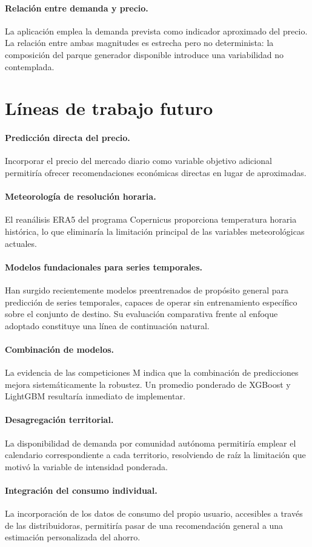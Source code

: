 \paragraph{Relación entre demanda y precio.}
La aplicación emplea la demanda prevista como indicador aproximado del precio. La
relación entre ambas magnitudes es estrecha pero no determinista: la composición
del parque generador disponible introduce una variabilidad no contemplada.


\section{Líneas de trabajo futuro}

\paragraph{Predicción directa del precio.}
Incorporar el precio del mercado diario como variable objetivo adicional
permitiría ofrecer recomendaciones económicas directas en lugar de aproximadas.

\paragraph{Meteorología de resolución horaria.}
El reanálisis ERA5 del programa Copernicus proporciona temperatura horaria
histórica, lo que eliminaría la limitación principal de las variables
meteorológicas actuales.

\paragraph{Modelos fundacionales para series temporales.}
Han surgido recientemente modelos preentrenados de propósito general para
predicción de series temporales, capaces de operar sin entrenamiento específico
sobre el conjunto de destino. Su evaluación comparativa frente al enfoque adoptado
constituye una línea de continuación natural.

\paragraph{Combinación de modelos.}
La evidencia de las competiciones M \parencite{makridakis2020m4} indica que la
combinación de predicciones mejora sistemáticamente la robustez. Un promedio
ponderado de XGBoost y LightGBM resultaría inmediato de implementar.

\paragraph{Desagregación territorial.}
La disponibilidad de demanda por comunidad autónoma permitiría emplear el
calendario correspondiente a cada territorio, resolviendo de raíz la limitación
que motivó la variable de intensidad ponderada.

\paragraph{Integración del consumo individual.}
La incorporación de los datos de consumo del propio usuario, accesibles a través
de las distribuidoras, permitiría pasar de una recomendación general a una
estimación personalizada del ahorro.
